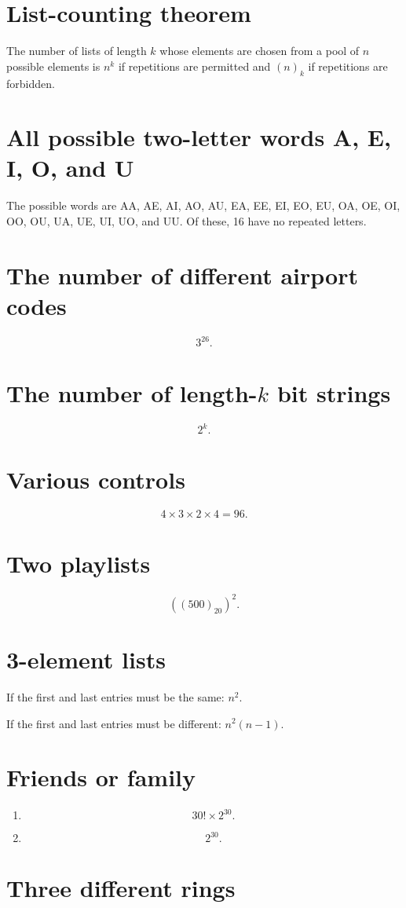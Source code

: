 \documentclass[12pt]{article}
\begin{document}
\section*{List-counting theorem}
The number of lists of length $k$ whose elements are chosen from a pool of $n$ possible elements is $n^k$ if repetitions are permitted and $(n)_k$ if repetitions are forbidden.
\section{All possible two-letter words A, E, I, O, and U}
The possible words are AA, AE, AI, AO, AU, EA, EE, EI, EO, EU, OA, OE, OI, OO, OU, UA, UE, UI, UO, and UU. Of these, 16 have no repeated letters.
\section{The number of different airport codes}
\[3^{26}.\]
\section{The number of length-$k$ bit strings}
\[2^k.\]
\section{Various controls}
\[4\times 3\times 2\times 4=96.\]
\section{Two playlists}
\[\left((500)_{20}\right)^2.\]
\section{3-element lists}
If the first and last entries must be the same: $n^2$.

If the first and last entries must be different: $n^2(n-1)$.
\section{Friends or family}
\begin{enumerate}
\item\[30!\times 2^{30}.\]
\item\[2^{30}.\]
\end{enumerate}
\section{Three different rings}
\end{document}
